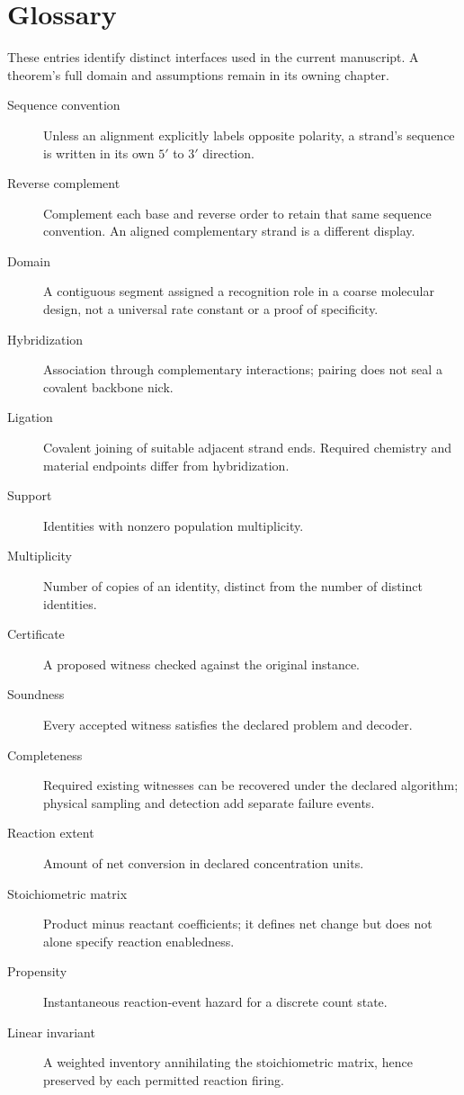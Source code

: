 \chapter*{Glossary}
These entries identify distinct interfaces used in the current manuscript.
A theorem's full domain and assumptions remain in its owning chapter.
\begin{description}
\item[Sequence convention] Unless an alignment explicitly labels opposite
polarity, a strand's sequence is written in its own $5'$ to $3'$ direction.
\item[Reverse complement] Complement each base and reverse order to retain that
same sequence convention. An aligned complementary strand is a different display.
\item[Domain] A contiguous segment assigned a recognition role in a coarse
molecular design, not a universal rate constant or a proof of specificity.
\item[Hybridization] Association through complementary interactions; pairing
does not seal a covalent backbone nick.
\item[Ligation] Covalent joining of suitable adjacent strand ends. Required
chemistry and material endpoints differ from hybridization.
\item[Support] Identities with nonzero population multiplicity.
\item[Multiplicity] Number of copies of an identity, distinct from the number
of distinct identities.
\item[Certificate] A proposed witness checked against the original instance.
\item[Soundness] Every accepted witness satisfies the declared problem and decoder.
\item[Completeness] Required existing witnesses can be recovered under the
declared algorithm; physical sampling and detection add separate failure events.
\item[Reaction extent] Amount of net conversion in declared concentration units.
\item[Stoichiometric matrix] Product minus reactant coefficients; it defines
net change but does not alone specify reaction enabledness.
\item[Propensity] Instantaneous reaction-event hazard for a discrete count state.
\item[Linear invariant] A weighted inventory annihilating the stoichiometric
matrix, hence preserved by each permitted reaction firing.

\end{description}
